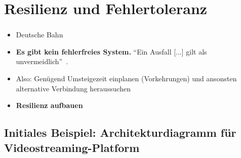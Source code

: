 %

\section{Resilienz und Fehlertoleranz}

\begin{frame}
    \frametitle{\insertsection}
    \begin{itemize}
        \item<1-> Deutsche Bahn
        \item<2-> \textbf{Es gibt kein fehlerfreies System.} \enquote{Ein Ausfall [...] gilt als unvermeidlich}~\cite{Haley.28.06.2018,Montesi.19.09.2016}.
        \item<3-> Also: Genügend Umsteigezeit einplanen (Vorkehrungen) und ansonsten alternative Verbindung heraussuchen
        \item<4-> \textbf{Resilienz aufbauen}
    \end{itemize}
\end{frame}

\subsection{Initiales Beispiel: Architekturdiagramm für Videostreaming-Platform}

\begin{frame}
    \frametitle{\insertsection}
    \framesubtitle{\insertsubsection}
    \vspace*{-14pt}
    \begin{figure}[h]
        \centering
		\resizebox{!}{.7\textheight}{%
			
		}
    \end{figure}
%    


\end{frame}


